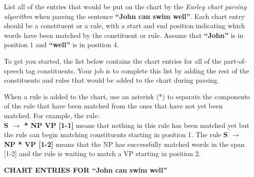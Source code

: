 \documentclass[11pt]{article}
\begin{document}
\begin{enumerate}
List all of the entries that would be put on the chart by the {\it Earley
chart parsing algorithm} when parsing the sentence {\bf ``John can swim
  well''}.  Each chart entry should be a constituent or a rule, with a
start and end position indicating which words have been matched by the
constituent or rule. Assume that {\bf ``John''} is in position 1 and
{\bf ``well''} is in position 4.

To get you started, the list below contains the chart entries for all
of the part-of-speech tag constituents. Your job is to complete
this list by adding the rest of the constituents and rules that would
be added to the chart during parsing.

When a rule is added to the chart,  use an asterisk (*) to separate the components
of the rule that have been matched from the ones that have not yet
been matched. For example, the rule: \\ {\bf S $\rightarrow$ * NP VP
  [1-1]} means that nothing in this rule has been matched yet but
the rule can begin matching constituents starting in position 1.  The
rule {\bf S $\rightarrow$ NP * VP [1-2]} means that the NP has
successfully matched words in the span [1-2] and the rule is waiting to match a VP
starting in position 2.

\newpage
\begin{center}
{\bf CHART ENTRIES FOR ``John can swim well''}  \\ ~ \\


\end{center}
\end{enumerate}
\end{document}
